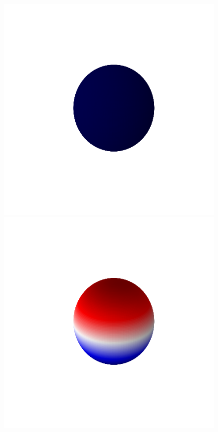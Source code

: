 \documentclass[11pt]{article}
\begin{document}
\begin{figure}
\includegraphics[scale=0.4]{./Images/s.png}
\includegraphics[scale=0.4]{./Images/p.png}

\end{figure}
\end{document}
